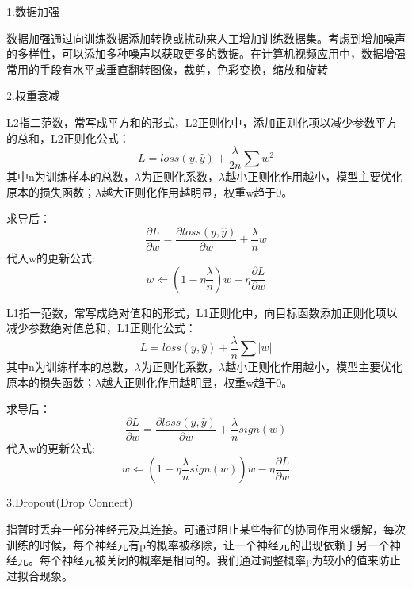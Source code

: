 \documentclass[openbib]{article}
\begin{document}
\begin{center}
	1.数据加强
\end{center}
数据加强通过向训练数据添加转换或扰动来人工增加训练数据集。考虑到增加噪声的多样性，可以添加多种噪声以获取更多的数据。在计算机视频应用中，数据增强常用的手段有水平或垂直翻转图像，裁剪，色彩变换，缩放和旋转
\begin{center}
	2.权重衰减
\end{center}

L2指二范数，常写成平方和的形式，L2正则化中，添加正则化项以减少参数平方的总和，L2正则化公式：
$$L=loss(y,\hat{y})+\frac{\lambda}{2n}\sum w^2$$
其中n为训练样本的总数，$\lambda$为正则化系数，$\lambda$越小正则化作用越小，模型主要优化原本的损失函数；$\lambda$越大正则化作用越明显，权重w趋于0。

求导后：$$\frac{\partial L}{\partial w}=\frac{\partial loss(y,\hat{y})}{\partial w}+\frac{\lambda}{n}w$$
代入w的更新公式:
$$w \Leftarrow (1-\eta \frac{\lambda}{n})w-\eta \frac{\partial L}{\partial w}$$

L1指一范数，常写成绝对值和的形式，L1正则化中，向目标函数添加正则化项以减少参数绝对值总和，L1正则化公式：
$$L=loss(y,\hat{y})+\frac{\lambda}{n}\sum |w|$$
其中n为训练样本的总数，$\lambda$为正则化系数，$\lambda$越小正则化作用越小，模型主要优化原本的损失函数；$\lambda$越大正则化作用越明显，权重w趋于0。

求导后：$$\frac{\partial L}{\partial w}=\frac{\partial loss(y,\hat{y})}{\partial w}+\frac{\lambda}{n}sign(w)$$
代入w的更新公式:
$$w \Leftarrow (1-\eta \frac{\lambda}{n}sign(w))w-\eta \frac{\partial L}{\partial w}$$
\begin{center}
	3.Dropout(Drop Connect)
\end{center}
指暂时丢弃一部分神经元及其连接。可通过阻止某些特征的协同作用来缓解，每次训练的时候，每个神经元有p的概率被移除，让一个神经元的出现依赖于另一个神经元。每个神经元被关闭的概率是相同的。我们通过调整概率p为较小的值来防止过拟合现象。
\end{document}
